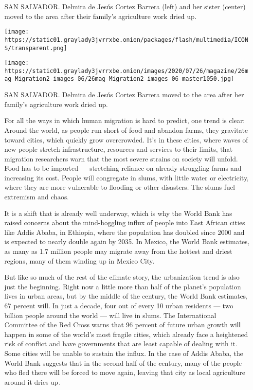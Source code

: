SAN SALVADOR. Delmira de Jesús Cortez Barrera (left) and her sister
(center) moved to the area after their family's agriculture work dried
up.

\texttt{[image: https://static01.graylady3jvrrxbe.onion/packages/flash/multimedia/ICONS/transparent.png]}

\texttt{[image: https://static01.graylady3jvrrxbe.onion/images/2020/07/26/magazine/26mag-Migration2-images-06/26mag-Migration2-images-06-master1050.jpg]}

SAN SALVADOR. Delmira de Jesús Cortez Barrera moved to the area after
her family's agriculture work dried up.

For all the ways in which human migration is hard to predict, one trend
is clear: Around the world, as people run short of food and abandon
farms, they gravitate toward cities, which quickly grow overcrowded.
It's in these cities, where waves of new people stretch infrastructure,
resources and services to their limits, that migration researchers warn
that the most severe strains on society will unfold. Food has to be
imported --- stretching reliance on already-struggling farms and
increasing its cost. People will congregate in slums, with little water
or electricity, where they are more vulnerable to flooding or other
disasters. The slums fuel extremism and chaos.

It is a shift that is already well underway, which is why the World Bank
has raised concerns about the mind-boggling influx of people into East
African cities like Addis Ababa, in Ethiopia, where the population has
doubled since 2000 and is expected to nearly double again by 2035. In
Mexico, the World Bank estimates, as many as 1.7 million people may
migrate away from the hottest and driest regions, many of them winding
up in Mexico City.

But like so much of the rest of the climate story, the urbanization
trend is also just the beginning. Right now a little more than half of
the planet's population lives in urban areas, but by the middle of the
century, the World Bank estimates, 67 percent will. In just a decade,
four out of every 10 urban residents --- two billion people around the
world --- will live in slums. The International Committee of the Red
Cross warns that 96 percent of future urban growth will happen in some
of the world's most fragile cities, which already face a heightened risk
of conflict and have governments that are least capable of dealing with
it. Some cities will be unable to sustain the influx. In the case of
Addis Ababa, the World Bank suggests that in the second half of the
century, many of the people who fled there will be forced to move again,
leaving that city as local agriculture around it dries up.

